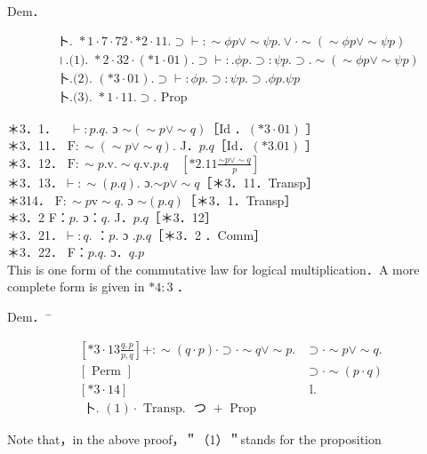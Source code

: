 \documentclass[10pt]{article}
\begin{document}
Dem．


\begin{align*}
& \text { ト. } * 1 \cdot 7 \cdot 72 \cdot * 2 \cdot 11 . \supset \vdash: \sim \phi p \vee \sim \psi p . \vee \cdot \sim(\sim \phi p \vee \sim \psi p)  \tag{1}\\
& \text { ।.(1). } * 2 \cdot 32 \cdot(* 1 \cdot 01) . \supset \vdash: . \phi p . \supset: \psi p . \supset . \sim(\sim \phi p \vee \sim \psi p)  \tag{2}\\
& \text { 卜.(2). }(* 3 \cdot 01) . \supset \vdash: \phi p . \supset: \psi p . \supset . \phi p . \psi p  \tag{3}\\
& \text { 卜.(3). } * 1 \cdot 11 . \supset \text {. Prop }
\end{align*}


＊3．1．$\quad \vdash: p . q$. ɔ $\sim(\sim p \vee \sim q)$［Id ．$(* 3 \cdot 01)$ ］\\
＊3．11． $\mathrm{F}: \sim(\sim p \vee \sim q)$. J．$p . q$［Id．$(* 3.01)$ ］\\
＊3．12． $\mathrm{F}: \sim p . \mathrm{v} . \sim q . \mathrm{v} . p . q \quad\left[* 2.11 \frac{\sim p \vee \sim q}{p}\right]$\\
＊3．13．$\vdash: \sim(p . q)$. ɔ.$\sim p \vee \sim q$［＊3．11．Transp］\\
＊314． $\mathrm{F}: \sim p \mathrm{v} \sim q$. ɔ $\sim(p . q)$［＊3．1．Transp］\\
＊3．2 F：$p$. ɔ：$q$. J．$p . q$［＊3．12］\\
＊3．21．$\vdash: q$. ：$p$. ɔ $. p . q$［＊3．2 ．Comm］\\
＊3．22． F：$p . q$. ɔ．$q . p$\\
This is one form of the commutative law for logical multiplication．A more complete form is given in $* 4: 3$ ．

Dem．${ }^{-}$

\[
\begin{array}{lr}
{\left[* 3 \cdot 13 \frac{q, p}{p, q}\right]+: \sim(q \cdot p) \cdot \supset \cdot \sim q \vee \sim p .} & \supset \cdot \sim p \vee \sim q . \\
{[\text { Perm }]} & \supset \cdot \sim(p \cdot q) \\
{[* 3 \cdot 14]} & \text { l. }  \tag{1}\\
\text { 卜. }(1) \cdot \text { Transp. } \text { つ }+ \text { Prop } &
\end{array}
\]

Note that，in the above proof，＂（1）＂stands for the proposition
\end{document}
